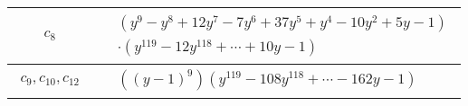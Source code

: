 \documentclass[1p]{elsarticle_modified}
\theoremstyle{definition}
\begin{document}
\begin{tabular}{m{50pt}|m{274pt}}
\hline $$\begin{aligned}c_{8}\end{aligned}$$&$\begin{aligned}
&(y^9- y^8+12 y^7-7 y^6+37 y^5+y^4-10 y^2+5 y-1)\\
&\cdot(y^{119}-12 y^{118}+\cdots+10 y-1)
\end{aligned}$\\
\hline $$\begin{aligned}c_{9},c_{10},c_{12}\end{aligned}$$&$\begin{aligned}
&((y-1)^9)(y^{119}-108 y^{118}+\cdots-162 y-1)
\end{aligned}$\\
\hline
\end{tabular}
\vskip 2pc
\end{document}
